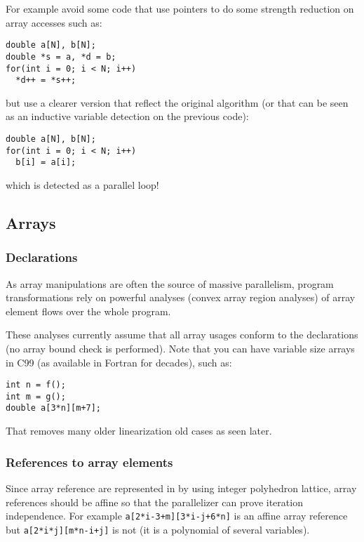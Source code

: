 \documentclass[a4paper]{article}
\begin{document}
For example avoid some code that use pointers to do some strength
reduction on array accesses such as:
\begin{lstlisting}
double a[N], b[N];
double *s = a, *d = b;
for(int i = 0; i < N; i++)
  *d++ = *s++;
\end{lstlisting}
but use a clearer version that reflect the original algorithm (or that can
be seen as an inductive variable detection on the previous code):
\begin{lstlisting}
double a[N], b[N];
for(int i = 0; i < N; i++)
  b[i] = a[i];
\end{lstlisting}
which is detected as a parallel loop!

\subsection{Arrays}
\label{sec:arrays}

\subsubsection{Declarations}
\label{sec:declarations}

As array manipulations are often the source of massive parallelism, \Apips
program transformations rely on powerful analyses (convex array region
analyses) of array element flows over the whole program.

These analyses currently assume that all array usages conform to the
declarations (no array bound check is performed). Note that you can have
variable size arrays in C99 (as available in Fortran for decades), such
as:
\begin{lstlisting}
int n = f();
int m = g();
double a[3*n][m+7];
\end{lstlisting}
That removes many older linearization old cases as seen later.


\subsubsection{References to array elements}
\label{sec:refer-array-elem}

Since array reference are represented in \Apips by using integer
polyhedron lattice, array references should be affine so that the
parallelizer can prove iteration independence. For example
\lstinline|a[2*i-3+m][3*i-j+6*n]| is an affine array reference but
\lstinline|a[2*i*j][m*n-i+j]| is not (it is a polynomial of several
variables).
\end{document}
